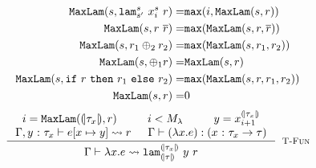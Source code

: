 \begin{align*}
\texttt{MaxLam}({s},{\texttt{lam}^{s}_{s'}\ {x^{s}_i}\ r}) =& \mathtt{max}(i, \texttt{MaxLam}({s},{r}))\\
\texttt{MaxLam}({s},{r\ \overline{r}}) =& \mathtt{max}(\texttt{MaxLam}({s},{r, \overline{r}})) \\
\texttt{MaxLam}({s},{r_1 \oplus_2 r_2}) = &  \mathtt{max}(\texttt{MaxLam}({s},{r_1, r_2}))\\
\texttt{MaxLam}({s},{\oplus_1 r}) =& \texttt{MaxLam}({s},{r})\\
\texttt{MaxLam}({s},{\mathtt{if}\ r\ \mathtt{then}\ r_1\ \mathtt{else}\ r_2}) =& \mathtt{max}(\texttt{MaxLam}({s},{r, r_1, r_2})) \\
\texttt{MaxLam}({s},{r}) =& 0 \\
\end{align*}
$$
\inference{
    i = \maxlam{\embed{\typ_x}}{\pred} & i < \maxlamarg & y = x^{\embed{\typ_x}}_{i+1} \\ 
    \tologicshort{\env, \tbind{y}{\typ_x}}{e\subst{x}{y}}{}{\pred}{}{}{} &
  	\hastype{\env}{(\efun{x}{}{e})}{(\tfun{x}{\typ_x}{\typ})}\\
}{
	\tologicshort{\env}{\efun{x}{}{e}}{}
	        {\smtlamname{\embed{\typ_x}}{\embed{\typ}}\ {y}\ {\pred}}
	        {}{}{}
}[\lgfun]
$$

